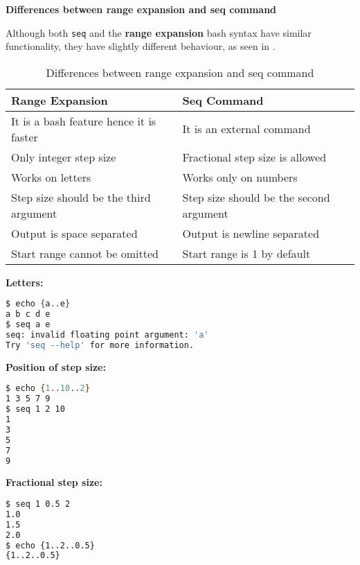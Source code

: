 \textbf{Differences between range expansion and seq command}

Although both \lstinline|seq| and the \textbf{range expansion} bash syntax have similar functionality, they have slightly different behaviour, as seen in .

\begin{table*}[h!]
  \caption{Differences between range expansion and seq command}
  \begin{tabular}{l l}
    \toprule
    \textbf{Range Expansion} & \textbf{Seq Command} \\
    \midrule
    It is a bash feature hence it is faster & It is an external command \\
    Only integer step size & Fractional step size is allowed \\
    Works on letters & Works only on numbers \\
    Step size should be the third argument & Step size should be the second argument \\
    Output is space separated & Output is newline separated \\
    Start range cannot be omitted & Start range is 1 by default \\
    \bottomrule
  \end{tabular}
\end{table*}

\textbf{Letters:}

\begin{lstlisting}[language=bash]
$ echo {a..e}
a b c d e
$ seq a e
seq: invalid floating point argument: 'a'
Try 'seq --help' for more information.
\end{lstlisting}

\textbf{Position of step size:}

\begin{lstlisting}[language=bash]
$ echo {1..10..2}
1 3 5 7 9
$ seq 1 2 10
1
3
5
7
9
\end{lstlisting}

\textbf{Fractional step size:}

\begin{lstlisting}[language=bash]
$ seq 1 0.5 2
1.0
1.5
2.0
$ echo {1..2..0.5}
{1..2..0.5}
\end{lstlisting}

